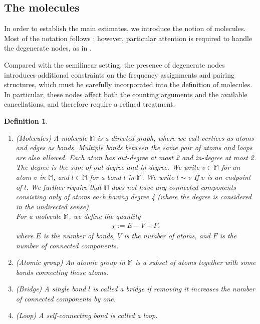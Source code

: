 \documentclass[UTF-8,reqno]{amsart}
\numberwithin{equation}{section}
\newtheorem{definition}[theorem]{Definition}
\theoremstyle{definition}
\begin{document}
\subsection{ The molecules}\label{sec:molecule}
In order to establish the main estimates, we introduce the notion of molecules. Most of the notation follows \cite{DH23a,Vas24}; however, particular attention is required to handle the degenerate nodes, as in \cite{Wu25}.


Compared with the semilinear setting, the presence of degenerate nodes introduces additional constraints on the frequency assignments and pairing structures, which must be carefully incorporated into the definition of molecules. In particular, these nodes affect both the counting arguments and the available cancellations, and therefore require a refined treatment.

\begin{definition}\label{def-molecules}
\begin{enumerate}
\item (Molecules)
A  molecule $\mathbb{M}$ is a directed graph, where we call vertices as  atoms and edges as bonds. Multiple bonds between the same pair of atoms and loops are also allowed. Each atom has out-degree at most 2 and in-degree at most 2. The degree is the sum of out-degree and in-degree.
We write $v \in \mathbb{M}$ for an atom $v$ in $\mathbb{M}$, and $l \in \mathbb{M}$ for a bond $l$ in $\mathbb{M}$. We write $l \sim v$ If $v$ is an endpoint of $l$. 
We further require that $\mathbb{M}$ does not have any connected components consisting only of atoms each having degree 4 (where the degree is considered in the undirected sense).\\
For a molecule $\mathbb{M}$, we define the quantity
\begin{align*}
\chi := E - V + F,
\end{align*}
where $E$ is the number of bonds, $V$ is the number of atoms, and $F$ is the number of connected components.

\item (Atomic group) An atomic group in $\mathbb{M}$ is a subset of atoms together with some bonds connecting those atoms. 

\item (Bridge)
A single bond $l$ is called a bridge if removing it increases the number of connected components by one.
\item (Loop) A self-connecting bond is called a loop.
\end{enumerate}
\end{definition}
\end{document}

